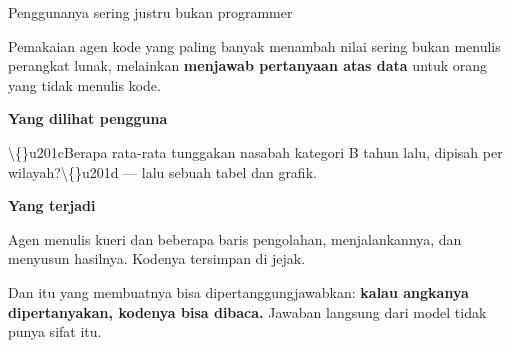 \documentclass[aspectratio=169,11pt,t]{beamer}
\begin{document}
\begin{frame}[shrink=25]{Penggunanya sering justru bukan programmer}
{\fontsize{9.4}{12.6}\selectfont\color{fg2}Pemakaian agen kode yang paling banyak menambah nilai sering bukan menulis perangkat lunak, melainkan \textbf{menjawab pertanyaan atas data} untuk orang yang tidak menulis kode.\par}\vskip 4pt
\begin{minipage}[t]{0.485\textwidth}
{\fontsize{9.4}{12.6}\selectfont\color{fg2}\textbf{Yang dilihat pengguna}\par}\vskip 4pt
{\fontsize{9.4}{12.6}\selectfont\color{fg2}\textbackslash\{\}u201cBerapa rata-rata tunggakan nasabah kategori B tahun lalu, dipisah per wilayah?\textbackslash\{\}u201d --- lalu sebuah tabel dan grafik.\par}\vskip 4pt

\end{minipage}%
\hfill
\begin{minipage}[t]{0.485\textwidth}
{\fontsize{9.4}{12.6}\selectfont\color{fg2}\textbf{Yang terjadi}\par}\vskip 4pt
{\fontsize{9.4}{12.6}\selectfont\color{fg2}Agen menulis kueri dan beberapa baris pengolahan, menjalankannya, dan menyusun hasilnya. Kodenya tersimpan di jejak.\par}\vskip 4pt

\end{minipage}%
\begin{iband}[signal]
Dan itu yang membuatnya bisa dipertanggungjawabkan: \textbf{kalau angkanya dipertanyakan, kodenya bisa dibaca.} Jawaban langsung dari model tidak punya sifat itu.
\end{iband}
\end{frame}

\end{document}
